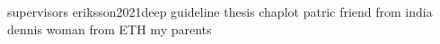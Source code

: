supervisors
eriksson2021deep
guideline thesis
chaplot
patric
friend from india
dennis
woman from ETH
my parents


